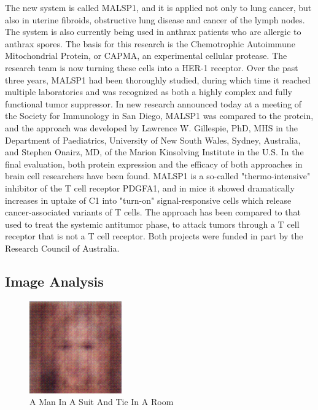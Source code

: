 \documentclass{article}%
\begin{document}
The new system is called MALSP1, and it is applied not only to lung cancer, but also in uterine fibroids, obstructive lung disease and cancer of the lymph nodes. The system is also currently being used in anthrax patients who are allergic to anthrax spores. The basis for this research is the Chemotrophic Autoimmune Mitochondrial Protein, or CAPMA, an experimental cellular protease. The research team is now turning these cells into a HER{-}1 receptor.\newline%
Over the past three years, MALSP1 had been thoroughly studied, during which time it reached multiple laboratories and was recognized as both a highly complex and fully functional tumor suppressor.\newline%
In new research announced today at a meeting of the Society for Immunology in San Diego, MALSP1 was compared to the protein, and the approach was developed by Lawrence W. Gillespie, PhD, MHS in the Department of Paediatrics, University of New South Wales, Sydney, Australia, and Stephen Onairz, MD, of the Marion Kinsolving Institute in the U.S. In the final evaluation, both protein expression and the efficacy of both approaches in brain cell researchers have been found.\newline%
MALSP1 is a so{-}called "thermo{-}intensive" inhibitor of the T cell receptor PDGFA1, and in mice it showed dramatically increases in uptake of C1 into "turn{-}on" signal{-}responsive cells which release cancer{-}associated variants of T cells.\newline%
The approach has been compared to that used to treat the systemic antitumor phase, to attack tumors through a T cell receptor that is not a T cell receptor. Both projects were funded in part by the Research Council of Australia.

%
\subsection{Image Analysis}%
\label{subsec:ImageAnalysis}%


\begin{figure}[h!]%
\centering%
\includegraphics[width=150px]{500_fake_images/samples_5_91.png}%
\caption{A Man In A Suit And Tie In A Room}%
\end{figure}

%
\end{document}
